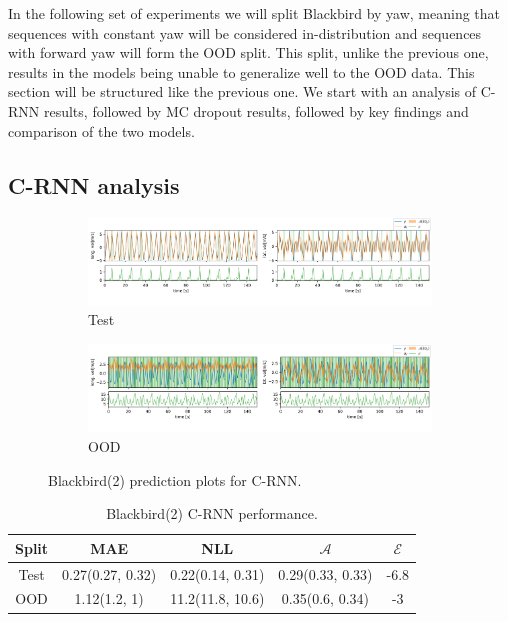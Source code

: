 
In the following set of experiments we will split Blackbird by yaw, meaning that sequences with constant yaw will be considered in-distribution and sequences with forward yaw will form the OOD split. This split, unlike the previous one, results in the models being unable to generalize well to the OOD data. This section will be structured like the previous one. We start with an analysis of C-RNN results, followed by MC dropout results, followed by key findings and comparison of the two models.

\subsection{C-RNN analysis}

\begin{figure}[h]
  \centering
  
  \begin{subfigure}[b]{\textwidth}
    \includegraphics[width=\textwidth]{Experiments/figs/bb2_test.png}
    \caption{Test}
  \end{subfigure}
  
  \begin{subfigure}[b]{\textwidth}
    \includegraphics[width=\textwidth]{Experiments/figs/bb2_ood.png}
    \caption{OOD}
  \end{subfigure}
  
  \caption{Blackbird(2) prediction plots for C-RNN.}
  \label{fig:bb2_run}
\end{figure}

\begin{table}[h]
\centering
    \begin{tabular}{c  c  c   c  c }  
        \toprule
        Split & MAE & NLL & $\mathcal{A}$ & $\mathcal{E}$\\
        \midrule
        Test & 0.27(0.27, 0.32) & 0.22(0.14, 0.31) & 0.29(0.33, 0.33) &  -6.8\\
        OOD  &  1.12(1.2, 1) &  11.2(11.8, 10.6) & 0.35(0.6, 0.34)&  -3\\
        \midrule
    \end{tabular}
    \caption{Blackbird(2) C-RNN performance.}
    \label{tbl:bb2_CRNN}
\end{table}


